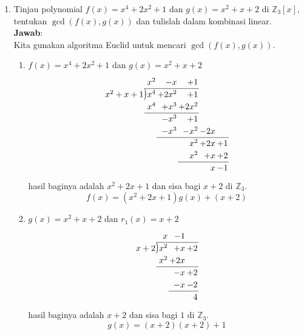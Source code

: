 \documentclass[10pt,openany,a4paper]{article}
\newcommand{\longdiv}{\smash{\mkern-0.43mu\vstretch{1.31}{\hstretch{.7}{)}}\mkern-5.2mu\vstretch{1.31}{\hstretch{.7}{)}}}}
\newcommand{\Z}{\mathbb{Z}}
\newcommand{\jawab}{\textbf{Jawab}:}
\begin{document}
\begin{enumerate}
    \item Tinjau polynomial $f(x)=x^4+2x^2+1$ dan $g(x)=x^2+x+2$ di $\Z_3[x]$, tentukan $\gcd(f(x),g(x))$ dan tulislah dalam kombinasi linear.\\
    \jawab\\
    Kita gunakan algoritma Euclid untuk mencari $\gcd(f(x),g(x))$.
    \begin{enumerate}[label=(\roman*)]
        \item $f(x)=x^4+2x^2+1$ dan $g(x)=x^2+x+2$
        \[
        \arraycolsep=1pt
        \renewcommand\arraystretch{1.2}
        \begin{array}{*1r @{\hskip\arraycolsep}c@{\hskip\arraycolsep} *{11}r}
            & &x^2&-x&+1&\\
    \cline{2-5}
    x^2+x+1 & \longdiv & x^4 & + 2x^2 &+ 1  \\
            &  & x^4 &+ x^3 & + 2x^2  \\
    \cline{2-5}
            &  & &-x^3 &+ 1  \\
            &  & &-x^3 &-x^2 &-2x  \\
    \cline{4-7}
            &  & & &x^2 &+2x &+ 1  \\
            &  & & &x^2 &+ x &+2  \\
    \cline{5-7}
            &  & & & &x &-1  \\
    \end{array}\]
    hasil baginya adalah $x^2+2x+1$ dan sisa bagi $x+2$ di $\Z_3$. 
    \begin{equation}\label{1}
        f(x)=(x^2+2x+1)g(x)+(x+2)
    \end{equation}
        \item $g(x)=x^2+x+2$ dan $r_1(x)=x+2$
        \[\arraycolsep=1pt
        \renewcommand\arraystretch{1.2}
        \begin{array}{*1r @{\hskip\arraycolsep}c@{\hskip\arraycolsep} *{11}r}
        & & x &-1 &\\
        \cline{2-5}
        x+2 & \longdiv & x^2 & +x & +2 \\
        & & x^2 & +2x\\
        \cline{2-5}
        & & & -x & +2 \\
        & & & -x & -2 \\
        \cline{4-5}
        & & & & 4
        \end{array}\]
        hasil baginya adalah $x+2$ dan sisa bagi $1$ di $\Z_3$.
        \begin{equation}\label{2}
            g(x)=(x+2)(x+2)+1
        \end{equation}

\end{enumerate}
\end{enumerate}
\end{document}

